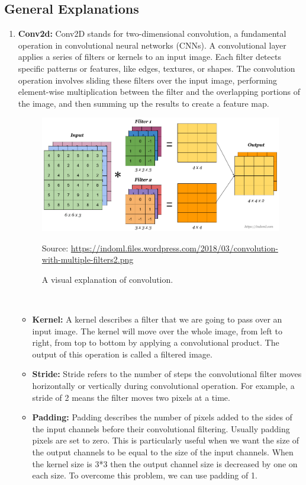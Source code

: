     \subsection{General Explanations}
    \begin{enumerate}[label=(\roman*)]
        \item {\bf Conv2d:} Conv2D stands for two-dimensional convolution, a fundamental operation in convolutional neural networks (CNNs). A convolutional layer applies a series of filters or kernels to an input image. Each filter detects specific patterns or features, like edges, textures, or shapes. The convolution operation involves sliding these filters over the input image, performing element-wise multiplication between the filter and the overlapping portions of the image, and then summing up the results to create a feature map.
        \begin{figure}[ht]
            \centering
            \includegraphics[width=5in]{./figures/conv2d.png}
            \caption{A visual explanation of convolution. }
            \par  Source: \url{https://indoml.files.wordpress.com/2018/03/convolution-with-multiple-filters2.png}
        \end{figure} \\
        \begin{itemize}
            \item {\bf Kernel:} A kernel describes a filter that we are going to pass over an input image. The kernel will move over the whole image, from left to right, from top to bottom by applying a convolutional product. The output of this operation is called a filtered image.
            \item {\bf Stride:} Stride refers to the number of steps the convolutional filter moves horizontally or vertically during convolutional operation. For example, a stride of 2 means the filter moves two pixels at a time.
            \item {\bf Padding:} Padding describes the number of pixels added to the sides of the input channels before their convolutional filtering. Usually padding pixels are set to zero. This is particularly useful when we want the size of the output channels to be equal to the size of the input channels. When the kernel size is  3*3  then the output channel size is decreased by one on each size. To overcome this problem, we can use padding of 1.

\end{itemize}
\end{enumerate}
